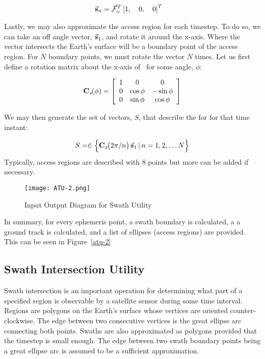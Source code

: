 \begin{align}
    \vec{\bm{\mathrm{s}}}_{n} &= \vec{\mathcal{F}}_o^T \left[ 1, \quad 0, \quad 0 \right]^T
\end{align}

\newcommand{\Cx}[1]{\ses{C}{x}\!\!\left(#1 \right)}

Lastly, we may also approximate the access region for each timestep. To do so,
we can take an off angle vector, $\vec{\bm{\mathrm{s}}}_{1}$, and rotate it around the
x-axis. Where the vector intersects the Earth's surface will be a boundary
point of the access region. For $N$ boundary points, we must rotate the vector
$N$ times. Let us first define a rotation matrix about the x-axis of \Fo~for
some angle, $\phi$:

\begin{equation}
    \Cx{\phi} = 
    \left[
	\begin{array}{ccc}
	1  & 0 & 0   \\
	0 & \cos\phi  & -\sin\phi   \\
	0 & \sin\phi  & \cos\phi
    \end{array}
    \right]
\end{equation}

We may then generate the set of vectors, $S$, that describe the \gls{for} for
that time instant:

\begin{equation}
    S = \in  \left\{ \Cx{2\pi/n} \sesv{s}{1} \, \vert \, n = 1, 2, \ldots N \right\}
\end{equation}
Typically, access regions are described with 8 points but more can be added if
necessary. 


\begin{figure}[h]
    \centering
    \texttt{[image: ATU-2.png]} 
    \caption{Input Output Diagram for Swath Utility}
    \label{fig:atu-2} 
\end{figure}

In summary, for every ephemeris point, a swath boundary is calculated, a a
ground track is calculated, and a list of ellipses (access regions) are
provided. This can be seen in Figure~\ref{atu-2}


\subsection{ Swath Intersection Utility }

Swath intersection is an important operation for determining what part of a
specified region is observable by a satellite sensor during some time interval.
Regions are polygons on the Earth’s surface whose vertices are oriented
counter-clockwise. The edge between two consecutive vertices is the great
ellipse arc connecting both points. Swaths are also approximated as polygons
provided that the timestep is small enough. The edge between two swath boundary
points being a great ellipse arc is assumed to be a sufficient approximation.

